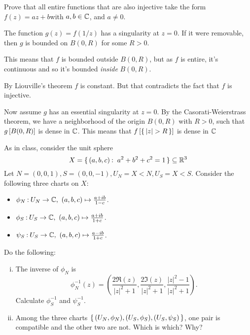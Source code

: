 \documentclass[12pt]{memoir}
\begin{document}
\begin{Ej}
    Prove that all entire functions that are also injective take the form $f (z) = az + b $with $a, b \in\mathbb{C}$, and $a \neq 0$. 
\end{Ej}

\begin{ptcbr}
The function $g(z)=f(1/z)$ has a singularity at $z=0$. If it were removable, then $g$ is bounded on $B(0,R)$ for some $R>0$.\par 
This means that $f$ is bounded outside $B(0,R)$, but as $f$ is entire, it's continuous and so it's bounded \emph{inside} $B(0,R)$.\par 
By Liouville's theorem $f$ is constant. But that contradicts the fact that $f$ is injective.\par 
Now assume $g$ has an essential singularity at $z=0$. By the Casorati-Weierstrass theorem, we have a neighborhood of the origin $B(0,R)$ with $R>0$, such that $g\left\lbrack B(0,R)\right\rbrack$ is dense in $\mathbb{C}$. This means that $f\bonj{\set{|z|>R}}$ is dense in $\mathbb{C}$
\end{ptcbr}

\begin{Ej}
    As in class, consider the unit sphere
    $$X=\set{(a,b,c)\:\ a^2+b^2+c^2=1}\subseteq\bR^3$$
    Let $N = (0, 0, 1), S = (0, 0, -1), U_N = X\less N, U_S = X\less S$. Consider the following three
    charts on $X$:
    \begin{itemize}
        \item $\phi_N\: U_N\to\bC,\ (a,b,c)\mapsto\frac{a+ib}{1-c}$.
        \item $\phi_S\: U_S\to\bC,\ (a,b,c)\mapsto\frac{a+ib}{1+c}$.
        \item $\psi_S\: U_S\to\bC,\ (a,b,c)\mapsto\frac{a-ib}{1+c}$.
    \end{itemize}
    Do the following:
    \begin{enumerate}[i)]
        \itemsep=-0.4em
        \item The inverse of $\phi_N$ is 
        $$\phi_N^{-1}(z)=\left(\frac
        {2\Re(z)}{|z|^2+1},\frac
        {2\Im(z)}{|z|^2+1},\frac
        {|z|^2-1}{|z|^2+1}\right).$$
        Calculate $\phi_S^{-1}$ and $\psi_S^{-1}$.
        \item Among the three charts $\{\,(U_N,\phi_N),(U_S,\phi_S),(U_S,\psi_S)\,\}$, one pair is compatible and the other two are not. Which is which? Why?\par 
    \end{enumerate}
\end{Ej}
\end{document}
